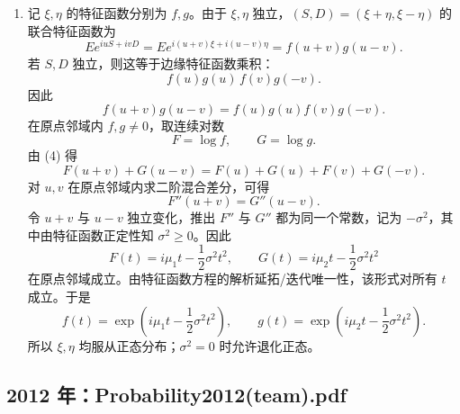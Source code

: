 \documentclass[UTF8,12pt]{ctexart}
\begin{document}
\begin{enumerate}[label=\textbf{\arabic*.},leftmargin=2.2em]
\item 记 \(\xi,\eta\) 的特征函数分别为 \(f,g\)。由于 \(\xi,\eta\) 独立，\((S,D)=(\xi+\eta,\xi-\eta)\) 的联合特征函数为
\[
E e^{iuS+ivD}
=E e^{i(u+v)\xi+i(u-v)\eta}
=f(u+v)g(u-v).
\]
若 \(S,D\) 独立，则这等于边缘特征函数乘积：
\[
f(u)g(u)\,f(v)g(-v).
\]
因此
\[
f(u+v)g(u-v)=f(u)g(u)f(v)g(-v). \tag{4}
\]
在原点邻域内 \(f,g\ne0\)，取连续对数
\[
F=\log f,\qquad G=\log g.
\]
由 (4) 得
\[
F(u+v)+G(u-v)=F(u)+G(u)+F(v)+G(-v). \tag{5}
\]
对 \(u,v\) 在原点邻域内求二阶混合差分，可得
\[
F''(u+v)=G''(u-v).
\]
令 \(u+v\) 与 \(u-v\) 独立变化，推出 \(F''\) 与 \(G''\) 都为同一个常数，记为 \(-\sigma^2\)，其中由特征函数正定性知 \(\sigma^2\ge0\)。因此
\[
F(t)=i\mu_1t-\frac12\sigma^2t^2,\qquad
G(t)=i\mu_2t-\frac12\sigma^2t^2
\]
在原点邻域成立。由特征函数方程的解析延拓/迭代唯一性，该形式对所有 \(t\) 成立。于是
\[
f(t)=\exp\left(i\mu_1t-\frac12\sigma^2t^2\right),\qquad
g(t)=\exp\left(i\mu_2t-\frac12\sigma^2t^2\right).
\]
所以 \(\xi,\eta\) 均服从正态分布；\(\sigma^2=0\) 时允许退化正态。
\end{enumerate}





\subsection{2012 年：Probability2012(team).pdf}
\end{document}
